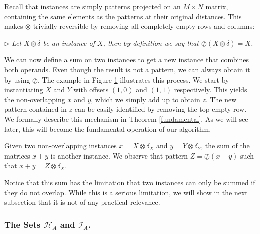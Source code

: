 \documentclass{llncs}
\begin{document}
Recall that instances are simply patterns projected on an $M\times N$ matrix, containing the same elements as the patterns at their original distances. This makes $\otimes$ trivially reversible by removing all completely empty rows and columns:

\smallskip
\noindent $\triangleright$
\emph{Let $X \otimes \delta$ be an instance of $X$, then by definition we say that $\oslash(X \otimes \delta) = X$.}
\smallskip

We can now define a sum on two instances to get a new instance that combines both operands. Even though the result is not a pattern, we can always obtain it by using $\oslash$. The example in Figure \ref{example2} illustrates this process. We start by instantiating $X$ and $Y$ with offsets $(1,0)$ and $(1,1)$ respectively. This yields the non-overlapping ${x}$ and ${y}$, which we simply add up to obtain ${z}$. The new pattern contained in ${z}$ can be easily identified by removing the top empty row. We formally describe this mechanism in Theorem \ref{fundamental}. As we will see later, this will become the fundamental operation of our algorithm.

\begin{figure}


\label{example2}
\end{figure}

\begin{theorem}\label{fundamental}
Given two non-overlapping instances ${x}=X\otimes \delta_X$ and ${y}=Y\otimes \delta_Y$, the sum of the matrices ${x} + {y}$ is another instance. We observe that pattern $Z=\oslash({x} + {y})$ such that ${x} + {y} = Z\otimes \delta_X$.
\end{theorem}

Notice that this sum has the limitation that two instances can only be summed if they do not overlap. While this is a serious limitation, we will show in the next subsection that it is not of any practical relevance.


\subsubsection{The Sets $\mathcal{H}_A$ and $\mathcal{I}_A$.}\label{thesetH}

\end{document}
